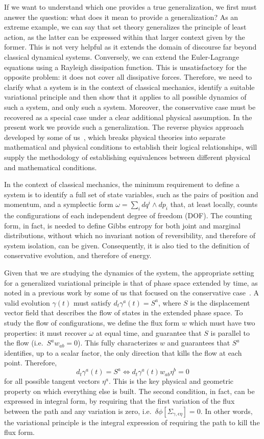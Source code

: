 \documentclass[nofootinbib,aps,pre]{revtex4-2}
\begin{document}
If we want to understand which one provides a true generalization, we first must answer the question: what does it mean to provide a generalization? As an extreme example, we can say that set theory generalizes the principle of least action, as the latter can be expressed within that larger context given by the former. This is not very helpful as it extends the domain of discourse far beyond classical dynamical systems. Conversely, we can extend the Euler-Lagrange equations using a Rayleigh dissipation function. This is unsatisfactory for the opposite problem: it does not cover all dissipative forces. Therefore, we need to clarify what a system is in the context of classical mechanics, identify a suitable variational principle and then show that it applies to all possible dynamics of such a system, and only such a system. Moreover, the conservative case must be recovered as a special case under a clear additional physical assumption. In the present work we provide such a generalization. The reverse physics approach developed by some of us~\cite{aop-book,aop-rp,aop-rpqm}, which breaks physical theories into separate mathematical and physical conditions to establish their logical relationships, will supply the methodology of establishing equivalences between different physical and mathematical conditions.

In the context of classical mechanics, the minimum requirement to define a system is to identify a full set of state variables, such as the pairs of position and momentum, and a symplectic form $\omega = \sum_i dq^i \wedge dp_i$ that, at least locally, counts the configurations of each independent degree of freedom (DOF). The counting form, in fact, is needed to define Gibbs entropy for both joint and marginal distributions, without which no invariant notion of reversibility, and therefore of system isolation, can be given. Consequently, it is also tied to the definition of conservative evolution, and therefore of energy.

Given that we are studying the dynamics of the system, the appropriate setting for a generalized variational principle is that of phase space extended by time, as noted in a previous work by some of us that focused on the conservative case~\cite{geoact}. A valid evolution $\gamma(t)$ must satisfy $d_t \gamma^a(t) = S^a$, where $S$ is the displacement vector field that describes the flow of states in the extended phase space. To study the flow of configurations, we define the flux form $w$ which must have two properties: it must recover $\omega$ at equal time, and guarantee that $S$ is parallel to the flow (i.e.~$S^a w_{ab} = 0$). This fully characterizes $w$ and guarantees that $S^a$ identifies, up to a scalar factor, the only direction that kills the flow at each point. Therefore,  $$d_t \gamma^a(t) = S^a \iff d_t \gamma^a(t) w_{ab} \eta^b=0$$ for all possible tangent vectors $\eta^a$. This is the key physical and geometric property on which everything else is built. The second condition, in fact, can be expressed in integral form, by requiring that the first variation of the flux between the path and any variation is zero, i.e.~$\delta \phi[\Sigma_{\gamma, \epsilon \eta}]=0$.  In other words, the variational principle is the integral expression of requiring the path to kill the flux form.
\end{document}
